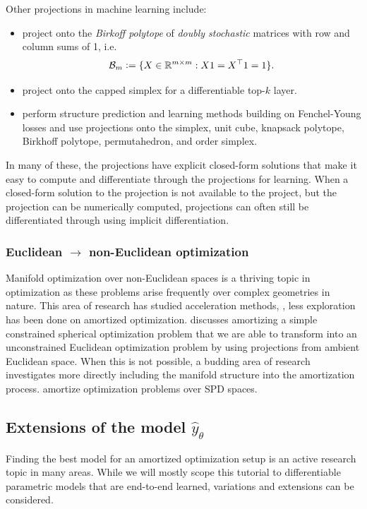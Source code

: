 \documentclass[twoside,11pt]{article}
\newcommand{\ie}{i.e.\xspace}
\begin{document}
Other projections in machine learning include:
\begin{itemize}
\item \citet{adams2011ranking,santa2017deeppermnet,mena2018learning}
  project onto the \emph{Birkoff polytope} of
  \emph{doubly stochastic} matrices with row and
  column sums of 1, \ie
  \begin{equation}
    \label{eq:birkhoff}
    {\mathcal{B}}_m\vcentcolon= \{X\in\mathbb{R}^{m\times m}: X1=X^\top1=1\}.
  \end{equation}
\item \citet{amos2019limited} project onto the capped
  simplex for a differentiable top-$k$ layer.
\item \citet{blondel2019structured} perform structure
  prediction and learning methods building on Fenchel-Young losses
  \citep{blondel2020learning} and use projections onto the
  simplex, unit cube, knapsack polytope, Birkhoff polytope,
  permutahedron, and order simplex.
\end{itemize}

In many of these, the projections have explicit closed-form
solutions that make it easy to compute and differentiate
through the projections for learning.
When a closed-form solution to the projection is not available to
the project, but the projection can be numerically computed,
projections can often still be differentiated through using
implicit differentiation.

\subsubsection{Euclidean $\rightarrow$ non-Euclidean optimization}
Manifold optimization \citep{absil2009optimization,hu2019brief}
over non-Euclidean spaces is a thriving topic in optimization
as these problems arise frequently over complex geometries in nature.
This area of research has studied acceleration methods,
\citep{duruisseaux2022accelerated}, less exploration
has been done on amortized optimization.
 discusses amortizing a simple
constrained spherical optimization problem that we are able
to transform into an unconstrained Euclidean optimization
problem by using projections from ambient Euclidean space.
When this is not possible, a budding area of research investigates
more directly including the manifold structure into the
amortization process. \citet{gao2020learning} amortize optimization
problems over SPD spaces.

\subsection{Extensions of the model $\hat y_\theta$}
Finding the best model for an amortized optimization setup
is an active research topic in many areas.
While we will mostly scope this tutorial to differentiable
parametric models that are end-to-end learned,
variations and extensions can be considered.
\end{document}
